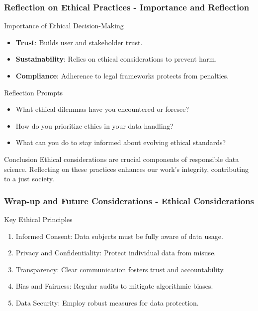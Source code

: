 \documentclass[aspectratio=169]{beamer}
\begin{document}
\begin{frame}[fragile]
    \frametitle{Reflection on Ethical Practices - Importance and Reflection}
    \begin{block}{Importance of Ethical Decision-Making}
        \begin{itemize}
            \item \textbf{Trust}: Builds user and stakeholder trust.
            \item \textbf{Sustainability}: Relies on ethical considerations to prevent harm.
            \item \textbf{Compliance}: Adherence to legal frameworks protects from penalties.
        \end{itemize}
    \end{block}
    
    \begin{block}{Reflection Prompts}
        \begin{itemize}
            \item What ethical dilemmas have you encountered or foresee?
            \item How do you prioritize ethics in your data handling?
            \item What can you do to stay informed about evolving ethical standards?
        \end{itemize}
    \end{block}
    
    \begin{block}{Conclusion}
        Ethical considerations are crucial components of responsible data science. 
        Reflecting on these practices enhances our work's integrity, contributing to a just society.
    \end{block}
\end{frame}

\begin{frame}[fragile]
    \frametitle{Wrap-up and Future Considerations - Ethical Considerations}
    
    \begin{block}{Key Ethical Principles}
        \begin{enumerate}
            \item Informed Consent: Data subjects must be fully aware of data usage.
            \item Privacy and Confidentiality: Protect individual data from misuse.
            \item Transparency: Clear communication fosters trust and accountability.
            \item Bias and Fairness: Regular audits to mitigate algorithmic biases.
            \item Data Security: Employ robust measures for data protection.
        \end{enumerate}
    \end{block}
\end{frame}
\end{document}
